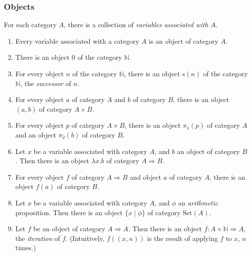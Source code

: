 \documentclass[acmtocl]{acmtrans2m}
\newcommand{\Set}[1]{\mathrm{Set} \left( {#1} \right)}
\newcommand{\s}{\mathrm{s}}
\newcommand{\boldarrow}{\Rightarrow}
\begin{document}
\subsubsection{Objects}
For each category $A$, there is a collection of \emph{variables associated with} $A$.
\begin{enumerate}
 \item Every variable associated with a category $A$ is an object of category $A$.
\item There is an object 0 of the category $\mathbb{N}$.
\item For every object $n$ of the category $\mathbb{N}$, there is an object $\s(n)$ of the category $\mathbb{N}$, the \emph{successor} of $n$.
\item For every object $a$ of category $A$ and $b$ of category $B$, there is an object $(a,b)$ of category $A \times B$.
\item For every object $p$ of category $A \times B$, there is an object $\pi_1(p)$ of category $A$ and an object $\pi_2(b)$ of category $B$.
\item Let $x$ be a variable associated with category $A$, and $b$ an object of category $B$.  Then there is an object $\lambda x.b$ of category $A \boldarrow B$.
\item For every object $f$ of category $A \boldarrow B$ and object $a$ of category $A$, there is an object $f(a)$ of category $B$.
\item Let $x$ be a variable associated with category $A$, and $\phi$ an \emph{arithmetic} proposition.  Then there is an object $\{ x \mid \phi \}$ of category $\Set{A}$.
\item Let $f$ be an object of category $A \boldarrow A$.  Then there is an object $\overline{f} : A \times \mathbb{N} \boldarrow A$, the \emph{iteration} of $f$.  (Intuitively, $\overline{f}((x,n))$ is the result of applying $f$  to $x$, $n$ times.)
\end{enumerate}
\end{document}
